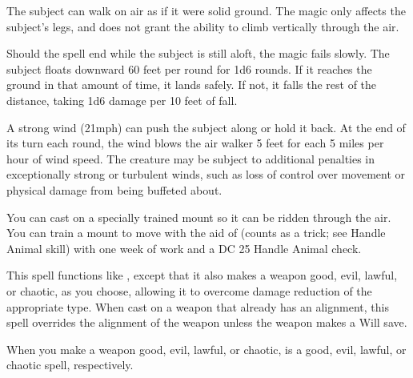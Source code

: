 \spellrng{\rngtouch}
\spelldur{\durshort}
\begin{spelleffect}
  The subject can walk on air as if it were solid ground. The magic only affects the subject's legs, and does not grant the ability to climb vertically through the air.
  \par Should the spell end while the subject is still aloft, the magic fails slowly. The subject floats downward 60 feet per round for 1d6 rounds. If it reaches the ground in that amount of time, it lands safely. If not, it falls the rest of the distance, taking 1d6 damage per 10 feet of fall.
\end{spelleffect}
\begin{spellnotes}
  A strong wind (21\add mph) can push the subject along or hold it back. At the end of its turn each round, the wind blows the air walker 5 feet for each 5 miles per hour of wind speed. The creature may be subject to additional penalties in exceptionally strong or turbulent winds, such as loss of control over movement or physical damage from being buffeted about.
  \par You can cast  on a specially trained mount so it can be ridden through the air. You can train a mount to move with the aid of  (counts as a trick; see Handle Animal skill) with one week of work and a DC 25 Handle Animal check.
\end{spellnotes}

\begin{spelleffect}
  This spell functions like , except that it also makes a weapon good, evil, lawful, or chaotic, as you choose, allowing it to overcome damage reduction of the appropriate type. When cast on a weapon that already has an alignment, this spell overrides the alignment of the weapon unless the weapon makes a Will save.
\end{spelleffect}
\begin{spellnotes}
  When you make a weapon good, evil, lawful, or chaotic,  is a good, evil, lawful, or chaotic spell, respectively.
\end{spellnotes}

